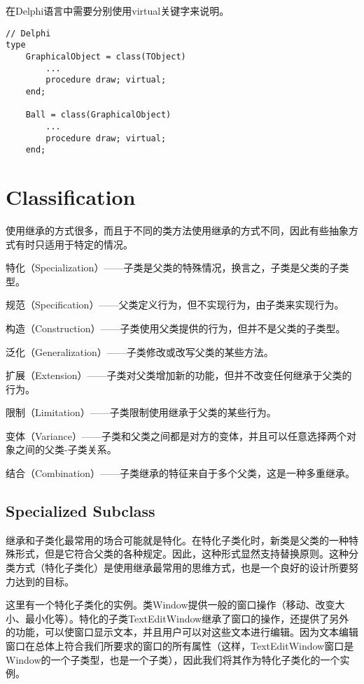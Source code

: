 在Delphi语言中需要分别使用virtual关键字来说明。



\begin{lstlisting}[language=Delphi]
// Delphi
type
	GraphicalObject = class(TObject)
		...
		procedure draw; virtual;
	end;

	Ball = class(GraphicalObject)
		...
		procedure draw; virtual;
	end;
\end{lstlisting}


\chapter{Classification}

使用继承的方式很多，而且于不同的类方法使用继承的方式不同，因此有些抽象方式有时只适用于特定的情况。

\begin{compactitem}
\item 特化（Specialization）——子类是父类的特殊情况，换言之，子类是父类的子类型。
\item 规范（Specification）——父类定义行为，但不实现行为，由子类来实现行为。
\item 构造（Construction）——子类使用父类提供的行为，但并不是父类的子类型。
\item 泛化（Generalization）——子类修改或改写父类的某些方法。
\item 扩展（Extension）——子类对父类增加新的功能，但并不改变任何继承于父类的行为。
\item 限制（Limitation）——子类限制使用继承于父类的某些行为。
\item 变体（Variance）——子类和父类之间都是对方的变体，并且可以任意选择两个对象之间的父类-子类关系。
\item 结合（Combination）——子类继承的特征来自于多个父类，这是一种多重继承。
\end{compactitem}


\section{Specialized Subclass}

继承和子类化最常用的场合可能就是特化。在特化子类化时，新类是父类的一种特殊形式，但是它符合父类的各种规定。因此，这种形式显然支持替换原则。这种分类方式（特化子类化）是使用继承最常用的思维方式，也是一个良好的设计所要努力达到的目标。

这里有一个特化子类化的实例。类Window提供一般的窗口操作（移动、改变大小、最小化等）。特化的子类TextEditWindow继承了窗口的操作，还提供了另外的功能，可以使窗口显示文本，并且用户可以对这些文本进行编辑。因为文本编辑窗口在总体上符合我们所要求的窗口的所有属性（这样，TextEditWindow窗口是Window的一个子类型，也是一个子类），因此我们将其作为特化子类化的一个实例。



